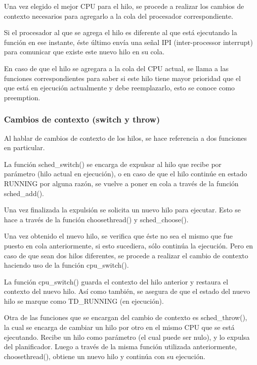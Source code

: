 Una vez elegido el mejor CPU para el hilo, se procede a realizar los cambios de contexto necesarios para agregarlo a la cola del procesador correspondiente.

Si el procesador al que se agrega el hilo es diferente al que está ejecutando la función en ese instante, éste último envía una señal IPI (inter-processor interrupt) para comunicar que existe este nuevo hilo en su cola.

En caso de que el hilo se agregara a la cola del CPU actual, se llama a las funciones correspondientes para saber si este hilo tiene mayor prioridad que el que está en ejecución actualmente y debe reemplazarlo, esto se conoce como preemption.

\subsubsection{Cambios de contexto (switch y throw)}
Al hablar de cambios de contexto de los hilos, se hace referencia a dos funciones en particular.\par

La función sched\_switch() se encarga de expulsar al hilo que recibe por parámetro (hilo actual en ejecución), o en caso de que el hilo continúe en estado RUNNING por alguna razón, se vuelve a poner en cola a través de la función sched\_add().\par

Una vez finalizada la expulsión se solicita un nuevo hilo para ejecutar. Esto se hace a través de la función choosethread() y sched\_choose().\par

Una vez obtenido el nuevo hilo, se verifica que éste no sea el mismo que fue puesto en cola anteriormente, si esto sucediera, sólo continúa la ejecución. Pero en caso de que sean dos hilos diferentes, se procede a realizar el cambio de contexto haciendo uso de la función cpu\_switch().\par

La función cpu\_switch() guarda el contexto del hilo anterior y restaura el contexto del nuevo hilo. Así como también, se asegura de que el estado del nuevo hilo se marque como TD\_RUNNING (en ejecución).\par

Otra de las funciones que se encargan del cambio de contexto es sched\_throw(), la cual se encarga de cambiar un hilo por otro en el mismo CPU que se está ejecutando. Recibe un hilo como parámetro (el cual puede ser nulo), y lo expulsa del planificador. Luego a través de la misma función utilizada anteriormente, choosethread(), obtiene un nuevo hilo y continúa con su ejecución.\par

